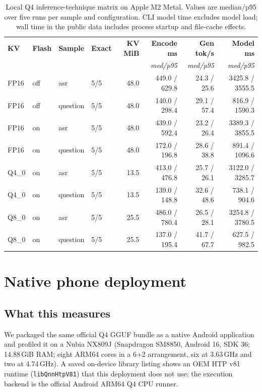 \documentclass[10pt,twocolumn,letterpaper]{article}
\begin{document}
\begin{table}[t]
\centering
\small
\caption{Local Q4 inference-technique matrix on Apple M2 Metal. Values are
median/p95 over five runs per sample and configuration. CLI model time
excludes model load; wall time in the public data includes process startup and
file-cache effects.}
\label{tab:q4}
\begin{tabular}{@{}llllrrrr@{}}
\toprule
\textbf{KV} & \textbf{Flash} & \textbf{Sample} & \textbf{Exact} & \textbf{KV MiB} &
\textbf{Encode ms} & \textbf{Gen tok/s} & \textbf{Model ms} \\
 & & & & & \textit{med/p95} & \textit{med/p95} & \textit{med/p95} \\
\midrule
FP16 & off & asr & 5/5 & 48.0 & 449.0 / 629.8 & 24.3 / 25.6 & 3425.8 / 3555.5 \\
FP16 & off & question & 5/5 & 48.0 & 140.0 / 298.4 & 29.1 / 57.4 & 816.9 / 1590.3 \\
FP16 & on & asr & 5/5 & 48.0 & 439.0 / 592.4 & 23.2 / 26.4 & 3389.3 / 3855.5 \\
FP16 & on & question & 5/5 & 48.0 & 172.0 / 196.8 & 28.6 / 38.8 & 891.4 / 1096.6 \\
Q4\_0 & on & asr & 5/5 & 13.5 & 413.0 / 476.8 & 25.7 / 26.1 & 3122.0 / 3285.7 \\
Q4\_0 & on & question & 5/5 & 13.5 & 139.0 / 148.8 & 32.6 / 48.6 & 738.1 / 904.6 \\
Q8\_0 & on & asr & 5/5 & 25.5 & 486.0 / 780.4 & 26.5 / 28.1 & 3254.8 / 3780.5 \\
Q8\_0 & on & question & 5/5 & 25.5 & 137.0 / 195.4 & 41.7 / 67.7 & 627.5 / 982.5 \\
\bottomrule
\end{tabular}
\end{table}

\section{Native phone deployment}
\label{sec:phone}

\subsection{What this measures}

We packaged the same official Q4 GGUF bundle as a native Android application
and profiled it on a Nubia NX809J (Snapdragon SM8850, Android 16, SDK 36;
14.88\,GiB RAM; eight ARM64 cores in a 6+2 arrangement, six at 3.63\,GHz and
two at 4.74\,GHz). A saved on-device library listing shows an OEM HTP v81
runtime (\texttt{libQnnHtpV81}) that this deployment does not use: the
execution backend is the official Android ARM64 Q4 CPU runner.
\end{document}

